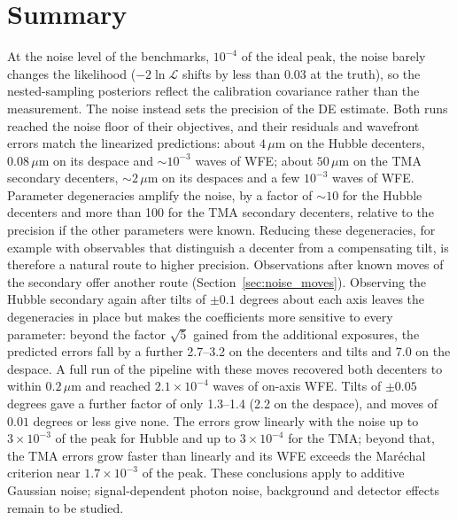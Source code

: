 \section{Summary}\label{sec:noise_summary}

At the noise level of the benchmarks, $10^{-4}$ of the ideal peak, the noise barely changes the likelihood ($-2\ln\mathcal{L}$ shifts by less than 0.03 at the truth), so the nested-sampling posteriors reflect the calibration covariance rather than the measurement. The noise instead sets the precision of the DE estimate. Both runs reached the noise floor of their objectives, and their residuals and wavefront errors match the linearized predictions: about $4\,\mu\mathrm{m}$ on the Hubble decenters, $0.08\,\mu\mathrm{m}$ on its despace and $\sim10^{-3}$ waves of WFE; about $50\,\mu\mathrm{m}$ on the TMA secondary decenters, $\sim2\,\mu\mathrm{m}$ on its despaces and a few $10^{-3}$ waves of WFE. Parameter degeneracies amplify the noise, by a factor of $\sim10$ for the Hubble decenters and more than 100 for the TMA secondary decenters, relative to the precision if the other parameters were known. Reducing these degeneracies, for example with observables that distinguish a decenter from a compensating tilt, is therefore a natural route to higher precision. Observations after known moves of the secondary offer another route (Section~\ref{sec:noise_moves}). Observing the Hubble secondary again after tilts of $\pm0.1$ degrees about each axis leaves the degeneracies in place but makes the coefficients more sensitive to every parameter: beyond the factor $\sqrt{5}$ gained from the additional exposures, the predicted errors fall by a further 2.7--3.2 on the decenters and tilts and 7.0 on the despace. A full run of the pipeline with these moves recovered both decenters to within $0.2\,\mu\mathrm{m}$ and reached $2.1\times10^{-4}$ waves of on-axis WFE. Tilts of $\pm0.05$ degrees gave a further factor of only 1.3--1.4 (2.2 on the despace), and moves of $0.01$ degrees or less give none. The errors grow linearly with the noise up to $3\times10^{-3}$ of the peak for Hubble and up to $3\times10^{-4}$ for the TMA; beyond that, the TMA errors grow faster than linearly and its WFE exceeds the Mar{\'e}chal criterion near $1.7\times10^{-3}$ of the peak. These conclusions apply to additive Gaussian noise; signal-dependent photon noise, background and detector effects remain to be studied.
